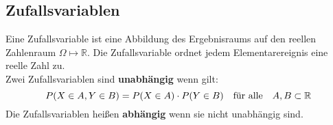 \documentclass[12pt]{article}
\begin{document}
\subsection{Zufallsvariablen}
Eine Zufallsvariable ist eine Abbildung des Ergebnisraums auf den reellen Zahlenraum $\Omega\longmapsto\mathbb{R}$. Die Zufallsvariable ordnet jedem Elementarereignis eine reelle Zahl zu.\\
Zwei Zufallsvariablen sind \textbf{unabhängig} wenn gilt:
\begin{equation*}
	P(X\in A, Y\in B) = P(X\in A) \cdot P(Y\in B) \text{\quad für alle\quad} A,B\subset \mathbb{R} 
\end{equation*}
Die Zufallsvariablen heißen \textbf{abhängig} wenn sie nicht unabhängig sind.
\end{document}
